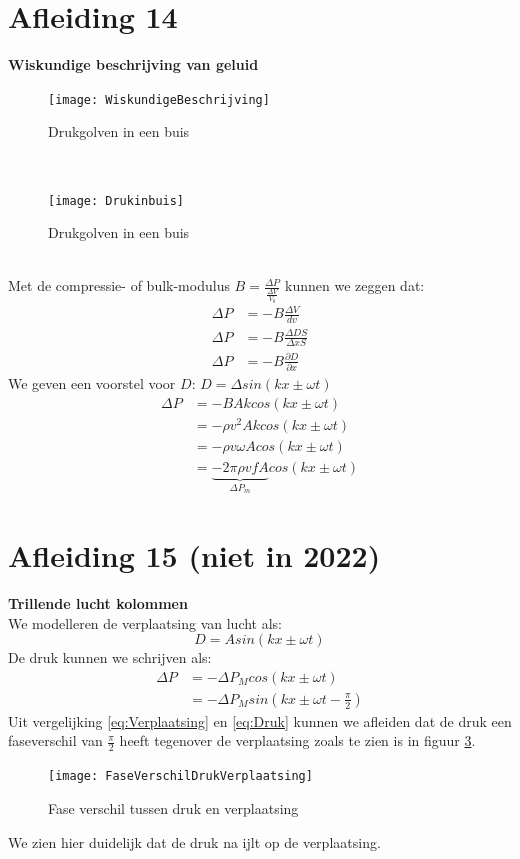 \documentclass[a4paper,kul]{kulakarticle} %
\begin{document}
\section{Afleiding 14}
\textbf{Wiskundige beschrijving van geluid}\\
\begin{figure}[h]
	\centering
	\texttt{[image: WiskundigeBeschrijving]}
	\caption[Drukgolven]{Drukgolven in een buis}
	\label{fig:drukgolvenbuis}
\end{figure}\\
\begin{figure}[h]
	\centering
	\texttt{[image: Drukinbuis]}
	\caption[Drukgolven]{Drukgolven in een buis}
	\label{fig:drukgolvenbuisgrafiek}
\end{figure}\\

Met de compressie- of bulk-modulus $B = \frac{\Delta P}{\frac{\Delta V}{V_0}}$ kunnen we zeggen dat:
\begin{align*}
	\Delta P &= -B \frac{\Delta V}{dv}\\
	\Delta P &= -B \frac{\Delta DS}{\Delta xS}\\
	\Delta P &= -B \frac{\partial D}{\partial x}
\end{align*}
We geven een voorstel voor $D$: $D = \Delta sin(kx\pm \omega t)$
\begin{align*}
	\Delta P &= -BAkcos(kx\pm \omega t)\\
	&= -\rho v^2Akcos(kx\pm \omega t)\\
	&= -\rho v\omega Acos(kx\pm \omega t)\\
	&= \underbrace{-2\pi\rho vfA}_{\Delta P_m} cos(kx\pm \omega t)
\end{align*}
\newpage
\section{Afleiding 15 (niet in 2022)}
\textbf{Trillende lucht kolommen}\\
We modelleren de verplaatsing van lucht als:
\begin{equation}
	\label{eq:Verplaatsing}
	D = Asin(kx\pm\omega t)
\end{equation}
De druk kunnen we schrijven als:
\begin{align}
	\Delta P &= -\Delta P_M cos(kx\pm\omega t)\\
	\label{eq:Druk}
	&= -\Delta P_M sin(kx\pm\omega t-\frac{\pi}{2})
\end{align}
Uit vergelijking \ref{eq:Verplaatsing} en \ref{eq:Druk} kunnen we afleiden dat de druk een faseverschil van $\frac{\pi}{2}$ heeft tegenover de verplaatsing zoals te zien is in figuur \ref{fig:faseverschildrukverplaatsing}. 
\begin{figure}[h]
	\centering
	\texttt{[image: FaseVerschilDrukVerplaatsing]}
	\caption[Fase vershil druk verplaatsing]{Fase verschil tussen druk en verplaatsing}
	\label{fig:faseverschildrukverplaatsing}
\end{figure}
We zien hier duidelijk dat de druk na ijlt op de verplaatsing. 
\newpage
\end{document}
